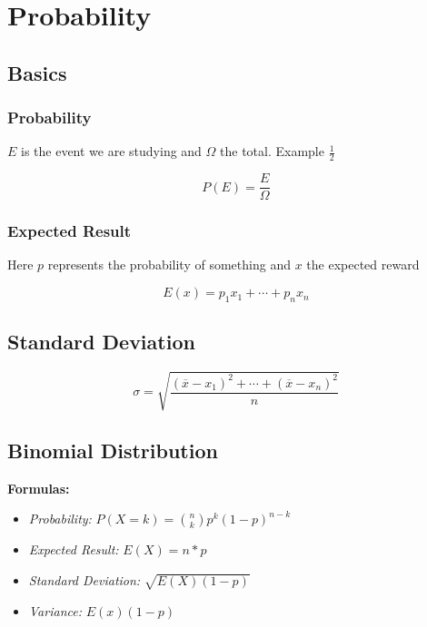 \newpage
\section{Probability}

\subsection{Basics}

\subsubsection{Probability}

\(E\) is the event we are studying and \(\Omega\) the total. Example \(\frac{1}{2}\)

\[
    P(E) = \frac{E}{\Omega}
\]

\subsubsection{Expected Result}

Here \(p\) represents the probability of something and \(x\) the expected reward

\[
    E(x) = p_1 x_1 + \cdots + p_n x_n
\]

\subsection{Standard Deviation}

\[
    \sigma = \sqrt{ \frac{ {(\overline{x} - x_1)}^2 + \cdots + {(\overline{x} - x_n)}^2 }{ n } }
\]


\subsection{Binomial Distribution}

\textbf{Formulas:}

\begin{itemize}

    \item \emph{Probability: } \(P(X = k) = \binom{n}{k} p^k {(1 - p)}^{n - k}\)

    \item \emph{Expected Result: } \(E(X) = n * p\)

    \item \emph{Standard Deviation: } \(\sqrt{E(X)(1-p)}\)

    \item  \emph{Variance: } \(E(x)(1-p)\)

\end{itemize}

